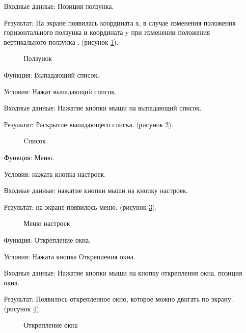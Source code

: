 Входные данные: Позиция ползунка.

Результат: На экране появилась координата х, в случае изменения положения горизонтального ползунка и координата y при изменении положения вертикального ползунка
. (рисунок \ref{scroll:image}).

\begin{figure}[H] %
	\caption{Ползунок}
	\label{scroll:image}
\end{figure}

Функция: Выпадающий список.

Условия: Нажат выпадающий список.

Входные данные: Нажатие кнопки мыши на выпадающий список.

Результат: Раскрытие выпадающего списка. (рисунок \ref{list:image}).

\begin{figure}[H] %
	\caption{Cписок}
	\label{list:image}
\end{figure}

Функция: Меню.

Условия: нажата кнопка настроек.

Входные данные: нажатие кнопки мыши на кнопку настроек.

Результат: на экране появилось меню. (рисунок \ref{menu:image}).

\begin{figure}[H] %
	\caption{Меню настроек}
	\label{menu:image}
\end{figure}

Функция: Открепление окна.

Условия: Нажата кнопка Открепления окна.

Входные данные: Нажатие кнопки мыши на кнопку открепления окна, позиция окна.

Результат: Появилось открепленное окно, которое можно двигать по экрану. (рисунок \ref{pin:image}).

\begin{figure}[H] %
	\caption{Открепление окна}
	\label{pin:image}
\end{figure}